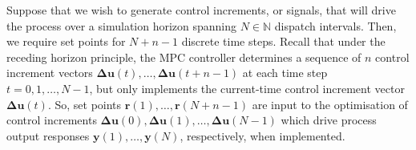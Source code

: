 \documentclass[a4paper, 10pt, twocolumn, preprint, 3p]{elsarticle}
\def\N{\mathbb{N}}
\begin{document}
Suppose that we wish to generate control increments, or signals, that will drive the process over a simulation horizon spanning ${N\in\N}$ dispatch intervals.  Then, we require set points for $N\!+\!n\!-\!1$ discrete time steps.  Recall that under the receding horizon principle, the MPC controller determines a sequence of $n$ control increment vectors ${\boldsymbol{\Delta{u}}(t), \ldots, \boldsymbol{\Delta{u}}(t\!+\!n\!-\!1)}$ at each time step ${t = 0, 1, \ldots, N\!-\!1}$, but only implements the current-time control increment vector $\boldsymbol{\Delta{u}}(t)$.  So, set points ${\boldsymbol{r}(1), \ldots, \boldsymbol{r}(N\!+\!n\!-\!1)}$ are input to the optimisation of control increments ${\boldsymbol{\Delta{u}}(0), \boldsymbol{\Delta{u}}(1), \ldots, \boldsymbol{\Delta{u}}(N\!-\!1)}$ which drive process output responses ${\boldsymbol{y}(1), \ldots, \boldsymbol{y}(N)}$, respectively, when implemented. 


\end{document}
